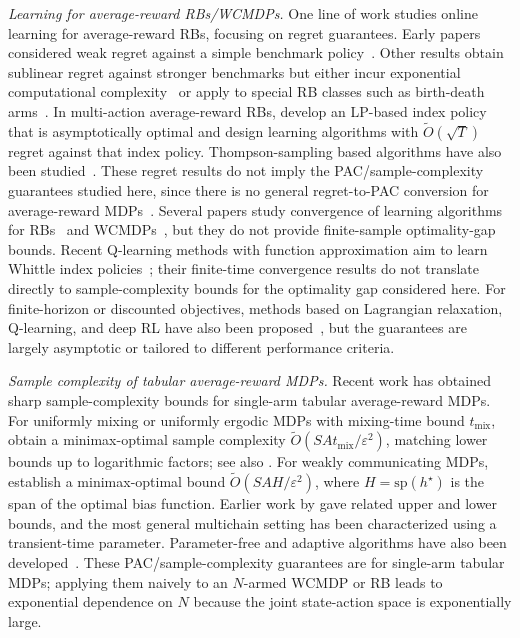 \documentclass[mnsc,nonblindrev]{informs3}
\begin{document}
\emph{Learning for average-reward RBs/WCMDPs.}
One line of work studies online learning for average-reward RBs, focusing on regret guarantees. Early papers considered weak regret against a simple benchmark policy~\citep{dai2011non,liu2011logarithmic,tekin2012online}. Other results obtain sublinear regret against stronger benchmarks but either incur exponential computational complexity~\citep{ortner2012regret} or apply to special RB classes such as birth-death arms~\citep{wang2020restless}. In multi-action average-reward RBs, \citet{xiong2022learning} develop an LP-based index policy that is asymptotically optimal and design learning algorithms with $\widetilde O(\sqrt T)$ regret against that index policy. Thompson-sampling based algorithms have also been studied~\citep{jung2019thompson}. These regret results do not imply the PAC/sample-complexity guarantees studied here, since there is no general regret-to-PAC conversion for average-reward MDPs~\citep{tuynman_finding_2024}. Several papers study convergence of learning algorithms for RBs~\citep{avrachenkov2022whittle,avrachenkov2024lagrangian,killian2021q} and WCMDPs~\citep{el2023weakly}, but they do not provide finite-sample optimality-gap bounds. Recent Q-learning methods with function approximation aim to learn Whittle index policies~\citep{xiong2023finite,xiong2024whittle}; their finite-time convergence results do not translate directly to sample-complexity bounds for the optimality gap considered here. For finite-horizon or discounted objectives, methods based on Lagrangian relaxation, Q-learning, and deep RL have also been proposed~\citep{killian2021q,robledo2022qwi,killian2022restless,nakhleh2021neurwin,robledo2024deep}, but the guarantees are largely asymptotic or tailored to different performance criteria.

\emph{Sample complexity of tabular average-reward MDPs.}
Recent work has obtained sharp sample-complexity bounds for single-arm tabular average-reward MDPs. For uniformly mixing or uniformly ergodic MDPs with mixing-time bound $t_{\mathrm{mix}}$, \citet{wang2024optimalsamplecomplexityaverage} obtain a minimax-optimal sample complexity $\widetilde O(SA t_{\mathrm{mix}}/\varepsilon^2)$, matching lower bounds up to logarithmic factors; see also \citet{jin_towards_2021}. For weakly communicating MDPs, \citet{zurek_span-based_2025} establish a minimax-optimal bound $\widetilde O(SAH/\varepsilon^2)$, where $H=\mathrm{sp}(h^\star)$ is the span of the optimal bias function. Earlier work by \citet{wang_near_2022} gave related upper and lower bounds, and the most general multichain setting has been characterized using a transient-time parameter. Parameter-free and adaptive algorithms have also been developed~\citep{tuynman_finding_2024,neu_dealing_2024,zurek_plug-approach_2024,lee2025near,zurek2025span}. These PAC/sample-complexity guarantees are for single-arm tabular MDPs; applying them naively to an $N$-armed WCMDP or RB leads to exponential dependence on $N$ because the joint state-action space is exponentially large.
\end{document}
